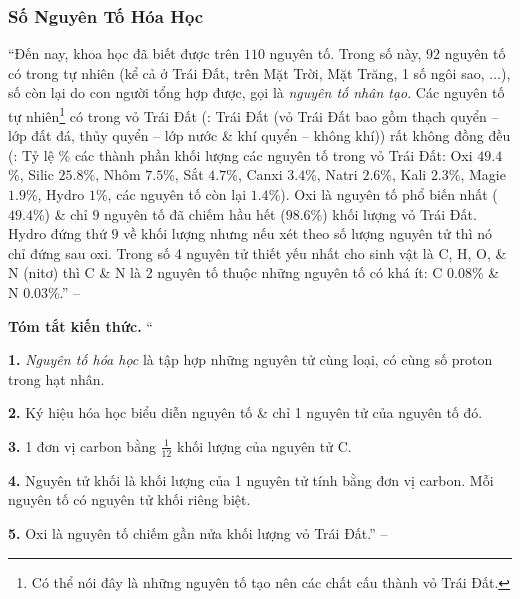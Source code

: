 \documentclass{article}
\numberwithin{equation}{section}
\begin{document}
\subsubsection{Số Nguyên Tố Hóa Học}
``Đến nay, khoa học đã biết được trên $110$ nguyên tố. Trong số này, $92$ nguyên tố có trong tự nhiên (kể cả ở Trái Đất, trên Mặt Trời, Mặt Trăng, 1 số ngôi sao, $\ldots$), số còn lại do con người tổng hợp được, gọi là \textit{nguyên tố nhân tạo}. Các nguyên tố tự nhiên\footnote{Có thể nói đây là những nguyên tố tạo nên các chất cấu thành vỏ Trái Đất.} có trong vỏ Trái Đất (\cite[Hình 1.7, p. 19]{SGK_Hoa_Hoc_8}: \textsf{Trái Đất (vỏ Trái Đất bao gồm thạch quyển -- lớp đất đá, thủy quyển -- lớp nước \& khí quyển -- không khí)}) rất không đồng đều (\cite[Hình 1.8, p. 19]{SGK_Hoa_Hoc_8}: \textsf{Tỷ lệ \% các thành phần khối lượng các nguyên tố trong vỏ Trái Đất: Oxi $49.4$\%, Silic $25.8$\%, Nhôm $7.5$\%, Sắt $4.7$\%, Canxi $3.4$\%, Natri $2.6$\%, Kali $2.3$\%, Magie $1.9$\%, Hydro $1$\%, các nguyên tố còn lại $1.4$\%}). Oxi là nguyên tố phổ biến nhất ($49.4$\%) \& chỉ $9$ nguyên tố đã chiếm hầu hết ($98.6$\%) khối lượng vỏ Trái Đất. Hydro đứng thứ $9$ về khối lượng nhưng nếu xét theo số lượng nguyên tử thì nó chỉ đứng sau oxi. Trong số 4 nguyên tử thiết yếu nhất cho sinh vật là C, H, O, \& N (nitơ) thì C \& N là 2 nguyên tố thuộc những nguyên tố có khá ít: C $0.08$\% \& N $0.03$\%.'' -- \cite[p. 19]{SGK_Hoa_Hoc_8}
\vspace{2mm}

\noindent\textbf{Tóm tắt kiến thức.}
``\begin{enumerate*}
	\item[\textbf{1.}] \textit{Nguyên tố hóa học} là tập hợp những nguyên tử cùng loại, có cùng số proton trong hạt nhân.
	\item[\textbf{2.}] Ký hiệu hóa học biểu diễn nguyên tố \& chỉ 1 nguyên tử của nguyên tố đó.
	\item[\textbf{3.}] 1 đơn vị carbon bằng $\frac{1}{12}$ khối lượng của nguyên tử C.
	\item[\textbf{4.}] Nguyên tử khối là khối lượng của 1 nguyên tử tính bằng đơn vị carbon. Mỗi nguyên tố có nguyên tử khối riêng biệt.
	\item[\textbf{5.}] Oxi là nguyên tố chiếm gần nửa khối lượng vỏ Trái Đất.'' -- \cite[p. 19]{SGK_Hoa_Hoc_8}
\end{enumerate*}
\end{document}
